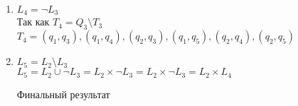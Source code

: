 \documentclass{article}
\begin{document}
\begin{enumerate}
    \item \(L_4= \neg L_3\) \\
    Так как \(T_4 = Q_3 \setminus T_3 \) \\
    \(T_4 = {(q_1,q_3), (q_1,q_4), (q_2,q_3), (q_1,q_5), (q_2,q_4), (q_2,q_5)}\)
    \begin{center}
            \begin{figure}[htbp]
                \centering
                
            \end{figure}
        \end{center}
    \item \(L_5= L_2 \setminus L_3\) \\
    \(L_5 = L_2 \cup \neg L_3 = L_2 \times \neg L_3 = L_2 \times \neg L_3 = L_2 \times L_4 \) 
    
     \begin{center}
            \begin{figure}[htbp]
                \centering
                
            \end{figure}
        \end{center}
       \newpage    
     \begin{center}
            \begin{figure}[htbp]
                \centering
                
            \end{figure}
        \end{center}
    Финальный результат  
     \begin{center}
            \begin{figure}[htbp]
                \centering
                
            \end{figure}
        \end{center}
    \end{enumerate}
    
\end{document}
